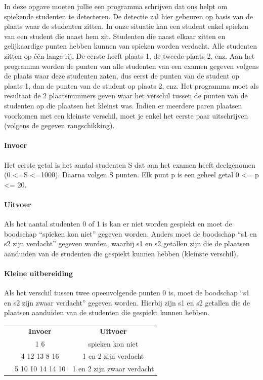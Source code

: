 In deze opgave moeten jullie een programma schrijven dat ons helpt om spiekende studenten te detecteren. De detectie zal hier gebeuren op basis van de plaats waar de studenten zitten. In onze situatie kan een student enkel spieken van een student die naast hem zit. Studenten die naast elkaar zitten en gelijkaardige punten hebben kunnen van spieken worden verdacht. Alle studenten zitten op \'e\'en lange rij. De eerste heeft plaats 1, de tweede plaats 2, enz. Aan het programma worden de punten van alle studenten van een examen gegeven volgens de plaats waar deze studenten zaten, dus eerst de punten van de student op plaats 1, dan de punten van de student op plaats 2, enz. Het programma moet als resultaat de 2 plaatsnummers geven waar het verschil tussen de punten van de studenten op die plaatsen het kleinst was. Indien er meerdere paren plaatsen voorkomen met een kleinste verschil, moet je enkel het eerste paar uitschrijven (volgens de gegeven rangschikking).

\paragraph{Invoer} Het eerste getal is het aantal studenten S dat aan het examen heeft deelgenomen (0 <=S <=1000). Daarna volgen S punten. Elk punt p is een geheel getal 0 <= p <= 20.

\paragraph{Uitvoer} Als het aantal studenten 0 of 1 is kan er niet worden gespiekt en moet de boodschap ``spieken kon niet'' gegeven worden. Anders moet de boodschap ``s1 en s2 zijn verdacht'' gegeven worden, waarbij s1 en s2 getallen zijn die de plaatsen aanduiden van de studenten die gespiekt kunnen hebben (kleinste verschil).

\paragraph{Kleine uitbereiding} Als het verschil tussen twee opeenvolgende punten 0 is, moet de boodschap ``s1 en s2 zijn zwaar verdacht'' gegeven worden. Hierbij zijn s1 en s2 getallen die de plaatsen aanduiden van de studenten die gespiekt kunnen hebben.

\begin{tabular}{ p{5 mm} c c }
 & \textbf{Invoer} & \textbf{Uitvoer} \\
 & 1 6 & spieken kon niet \\
 & 4 12 13 8 16 & 1 en 2 zijn verdacht \\
 & 5 10 10 14 14 10 & 1 en 2 zijn zwaar verdacht \\
\end{tabular}

